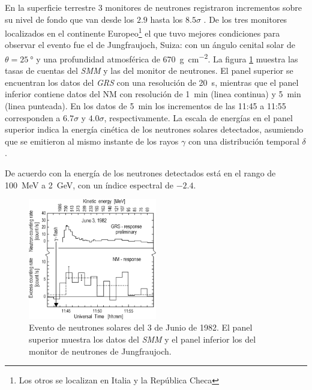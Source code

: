 En la superficie terrestre \num{3} monitores de neutrones registraron incrementos sobre su nivel de fondo que van desde los $2.9$ hasta los $8.5\sigma$ \cite{chupp87}. De los tres monitores localizados en el continente Europeo\footnote{Los otros se localizan en Italia y la República Checa} el que tuvo mejores condiciones para observar el evento fue el de  Jungfraujoch, Suiza: con un ángulo cenital solar de $\theta=\SI{25}{\degree}$ y una profundidad atmosférica de \SI{670}{\gram\per\square\cm}. La figura \ref{fig:neutrons-ground} muestra las tasas de cuentas del \emph{SMM} y las del monitor de neutrones. El panel superior se encuentran los datos del \emph{GRS} con una resolución de \SI{20}{\second}, mientras que el panel inferior contiene datos del NM con resolución de \SI{1}{\minute} (linea continua) y \SI{5}{\minute} (linea punteada). En los datos de \SI{5}{\minute} los incrementos de las 11:45 a 11:55 corresponden a $6.7\sigma$ y $4.0\sigma$, respectivamente. La escala de energías en el panel superior indica la energía cinética de los neutrones solares detectados, asumiendo que se emitieron al mismo instante de los rayos $\gamma$ con una distribución temporal $\delta$.

De acuerdo con \cite{chupp87} la energía de los neutrones detectados está en el rango de \SI{100}{\mega\electronvolt} a \SI{2}{\giga\electronvolt}, con un índice espectral de $-2.4$.

\begin{figure}
        \centering
        \includegraphics[width=0.5\textwidth]{neutrons-ground.png}
        \caption{Evento de neutrones solares del \num{3} de Junio de \num{1982}. El panel superior muestra los datos del \emph{SMM} y el panel inferior los del monitor de neutrones de Jungfraujoch.}
        \label{fig:neutrons-ground}
\end{figure}

